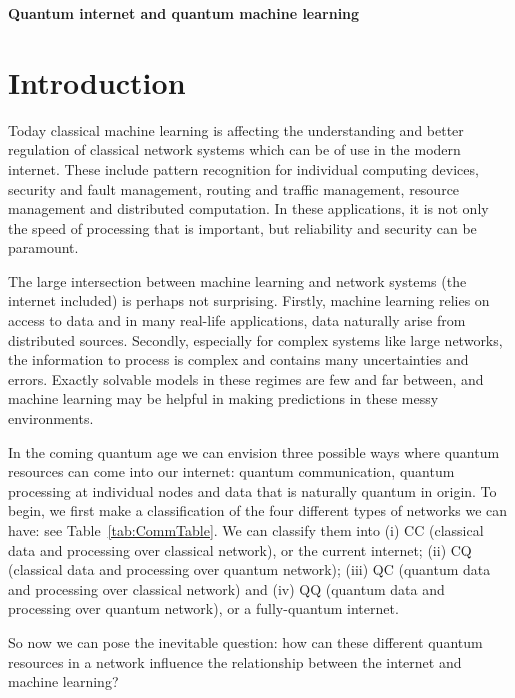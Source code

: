 \documentclass[twocolumn, aps, rmp, amsmath, amssymb, nofootinbib, superscriptaddress, longbibliography, floatfix, table-of-contents, eqsecnum]{revtex4-2}
\begin{document}

\noindent \textbf{Quantum internet and quantum machine learning}

\tableofcontents 

\section{Introduction}

Today classical machine learning is affecting the understanding and better regulation of classical network systems which can be of use in the modern internet. These include pattern recognition for individual computing devices, security and fault management, routing and traffic management, resource management and distributed computation. In these applications, it is not only the speed of processing that is important, but reliability and security can be paramount.

The large intersection between machine learning and network systems (the internet included) is perhaps not surprising. Firstly, machine learning relies on access to data and in many real-life applications, data naturally arise from distributed sources. Secondly, especially for complex systems like large networks, the information to process is complex and contains many uncertainties and errors. Exactly solvable models in these regimes are few and far between, and machine learning may be helpful in making predictions in these messy environments.

In the coming quantum age we can envision three possible ways where quantum resources can come into our internet: quantum communication, quantum processing at individual nodes and data that is naturally quantum in origin. To begin, we first make a classification of the four different types of networks we can have: see Table~\eqref{tab:CommTable}. We can classify them into (i) CC (classical data and processing over classical network), or the current internet; (ii) CQ (classical data and processing over quantum network); (iii) QC (quantum data and processing over classical network) and (iv) QQ (quantum data and processing over quantum network), or a fully-quantum internet.

So now we can pose the inevitable question: how can these different quantum resources in a network influence the relationship between the internet and machine learning?
\end{document}
